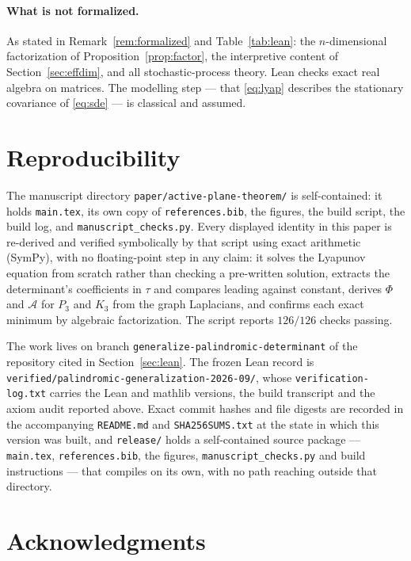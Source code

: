 \documentclass[11pt]{article}
\theoremstyle{plain}
\theoremstyle{definition}
\theoremstyle{remark}
\newcommand{\Aco}{\mathcal{A}}
\begin{document}
\paragraph{What is not formalized.} As stated in Remark~\ref{rem:formalized} and
Table~\ref{tab:lean}: the $n$-dimensional factorization of Proposition~\ref{prop:factor}, the
interpretive content of Section~\ref{sec:effdim}, and all stochastic-process theory. Lean checks
exact real algebra on matrices. The modelling step --- that \eqref{eq:lyap} describes the
stationary covariance of \eqref{eq:sde} --- is classical and assumed.

\section{Reproducibility}\label{sec:repro}

The manuscript directory \texttt{paper/active-plane-theorem/} is self-contained: it holds
\texttt{main.tex}, its own copy of \texttt{references.bib}, the figures, the build script, the
build log, and \texttt{manuscript\_checks.py}. Every displayed identity in this paper is
re-derived and verified symbolically by that script using exact arithmetic (SymPy), with no
floating-point step in any claim: it solves the Lyapunov equation from scratch rather than
checking a pre-written solution, extracts the determinant's coefficients in $\tau$ and compares
leading against constant, derives $\Phi$ and $\Aco$ for $P_3$ and $K_3$ from the graph
Laplacians, and confirms each exact minimum by algebraic factorization. The script reports
$126/126$ checks passing.

The work lives on branch \texttt{generalize-palindromic-determinant} of the repository cited in
Section~\ref{sec:lean}. The frozen Lean record is
\texttt{verified/palindromic-generalization-2026-09/}, whose \texttt{verification-log.txt}
carries the Lean and mathlib versions, the build transcript and the axiom audit reported above.
Exact commit hashes and file digests are recorded in the accompanying \texttt{README.md} and
\texttt{SHA256SUMS.txt} at the state in which this version was built, and
\texttt{release/} holds a self-contained source package --- \texttt{main.tex},
\texttt{references.bib}, the figures, \texttt{manuscript\_checks.py} and build instructions ---
that compiles on its own, with no path reaching outside that directory.

\section*{Acknowledgments}
\end{document}

